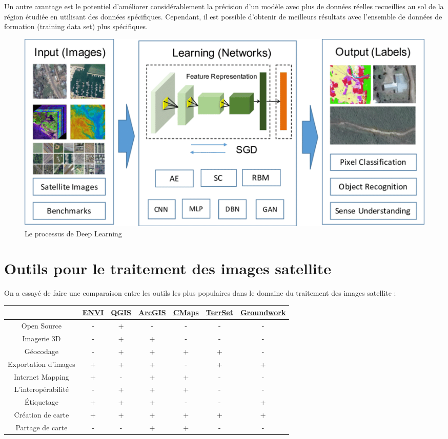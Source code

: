 \documentclass[12pt, openany]{report}
\begin{document}
Un autre avantage est le potentiel d'améliorer considérablement la précision d'un modèle avec plus de données réelles recueillies au sol de la région étudiée en utilisant des données spécifiques. Cependant, il est possible d'obtenir de meilleurs résultats avec l'ensemble de données de formation (training data set) plus spécifiques.

\begin{figure}[H]
\centering
\includegraphics[scale=0.5]{deep.png}
\caption{Le processus de Deep Learning}
\end{figure}

\section{Outils pour le traitement des images satellite}

On a essayé de faire une comparaison entre les outils les plus populaires dans le domaine du traitement des images satellite :

{\setlength{\tabulinesep}{3pt}
\begin{tabu}{|c|c|c|c|c|c|c|}
\hline
{}&\href{https://www.harrisgeospatial.com/Software-Technology/ENVI}{ENVI}&\href{https://qgis.org/fr/site/}{QGIS}&\href{https://www.arcgis.com/index.html}{ArcGIS}&\href{https://cmapsconnect.com/}{CMaps}&\href{https://clarklabs.org/terrset/}{TerrSet}&\href{https://groundwork.azavea.com/}{Groundwork}\\
\hline
Open Source & - & + & - & - & - & -\\
\hline
Imagerie 3D & - & + & + & - & - & -\\
\hline
Géocodage & - & + & + & + & + & -\\
\hline
Exportation d'images & + & + & + & - & + & +\\
\hline
Internet Mapping & + & - & + & + & - & -\\
\hline
L'interopérabilité & - & + & + & + & - & -\\
\hline
Étiquetage & + & + & + & - & - & +\\
\hline
Création de carte & + & + & + & + & + & +\\
\hline
Partage de carte & - & - & + & + & - & -\\
\hline
\end{tabu}}\\
\end{document}
